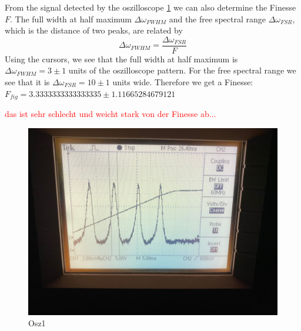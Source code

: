 \documentclass{article}
\begin{document}
From the signal detected by the oszilloscope \ref{Osz1} we can also determine the Finesse $F$. The full width at half maximum $\Delta\omega_{FWHM}$ and the free spectral range $\Delta\omega_{FSR}$, which is the distance of two peaks, are related by 
\begin{equation}
\Delta\omega_{FWHM} = \frac{\Delta\omega_{FSR}}{F}
\label{FinesseOszilloskopbild}
\end{equation}
Using the cursors, we see that the full width at half maximum is $\Delta\omega_{FWHM} =3 \pm 1$ units of the oszilloscope pattern. For the free spectral range we see that it is $\Delta\omega_{FSR} = 10 \pm 1$ units wide. Therefore we get a Finesse:\\
$F_{fig} = 3.3333333333333335 \pm 1.11665284679121$

\textcolor{red}{das ist sehr schlecht und weicht stark von der Finesse ab...}

\begin{figure}
\includegraphics[width=\textwidth]{oszilloskopbild.jpg}
\caption{Osz1}
\label{Osz1}
\end{figure}
\end{document}
